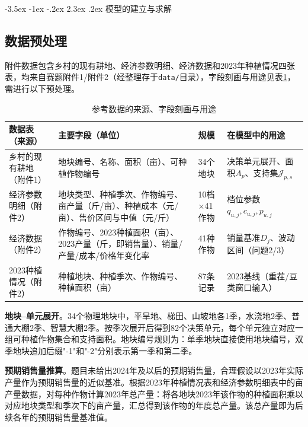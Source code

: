 \documentclass[12pt,a4paper]{article}
\makeatletter
\renewcommand\section{\@startsection{section}{1}{\z@}%
  {-3.5ex \@plus -1ex \@minus -.2ex}%
  {2.3ex \@plus .2ex}%
  {\centering\normalfont\Large\bfseries}}
\makeatother
\begin{document}
\section{模型的建立与求解}

\subsection{数据预处理}

附件数据包含乡村的现有耕地、经济参数明细、经济数据和2023年种植情况四张表，均来自赛题附件1/附件2（经整理存于\texttt{data/}目录），字段刻画与用途见表\ref{tab:data}，需进行以下预处理。
\begin{table}[H]
\centering
\caption{参考数据的来源、字段刻画与用途}
\label{tab:data}
\begin{tabular}{p{3cm}p{5.6cm}p{1.8cm}p{3.6cm}}
\toprule
数据表（来源） & 主要字段（单位） & 规模 & 在模型中的用途\\
\midrule
乡村的现有耕地（附件1） & 地块编号、名称、面积（亩）、可种植作物编号 & 34个地块 & 决策单元展开、面积$A_p$、支持集$\mathcal{J}_{p,s}$\\
经济参数明细（附件2） & 地块类型、种植季次、作物编号、亩产量（斤/亩）、种植成本（元/亩）、售价区间与中值（元/斤） & 10档$\times$41作物 & 档位参数$q_{u,j},c_{u,j},p_{u,j}$\\
经济数据（附件2） & 作物编号、2023种植面积（亩）、2023产量（斤，即销售量）、销量/产量/成本/价格年变化率 & 41种作物 & 销量基准$D_j$、波动区间（问题2/3）\\
2023种植情况（附件2） & 种植地块、种植季次、作物编号、种植面积（亩） & 87条记录 & 2023基线（重茬/豆类窗口输入）\\
\bottomrule
\end{tabular}
\end{table}

\textbf{地块--单元展开}。34个物理地块中，平旱地、梯田、山坡地各1季，水浇地2季、普通大棚2季、智慧大棚2季。按季次展开后得到82个决策单元，每个单元独立对应一组可种植作物集合和支持面积。地块编号规则为：单季地块直接使用地块编号，双季地块追加后缀"-1"和"-2"分别表示第一季和第二季。

\textbf{预期销售量推算}。题目未给出2024年及以后的预期销售量，合理假设以2023年实际产量作为预期销售量的近似基准。根据2023年种植情况表和经济参数明细表中的亩产量数据，对每种作物计算2023年总产量：将各地块2023年该作物的种植面积乘以对应地块类型和季次下的亩产量，汇总得到该作物的年度总产量。该总产量即为后续各年的预期销售量基准值。
\end{document}
